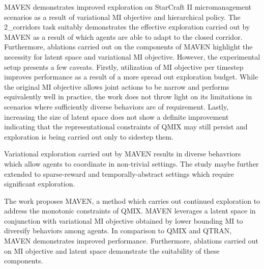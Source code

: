\documentclass[11pt,letterpaper]{article}
\begin{document}
MAVEN demonstrates improved exploration on StarCraft II micromanagement scenarios as a result of variational MI objective and hierarchical policy. The 2\_corridors task suitably demonstrates the effective exploration carried out by MAVEN as a result of which agents are able to adapt to the closed corridor. Furthermore, ablations carried out on the components of MAVEN highlight the necessity for latent space and variational MI objective. However, the experimental setup presents a few caveats. Firstly, utilization of MI objective per timestep improves performance as a result of a more spread out exploration budget. While the original MI objective allows joint actions to be narrow and performs equivalently well in practice, the work does not throw light on its limitations in scenarios where sufficiently diverse behaviors are of requirement. Lastly, increasing the size of latent space does not show a definite improvement indicating that the representational constraints of QMIX may still persist and exploration is being carried out only to sidestep them. 

Variational exploration carried out by MAVEN results in diverse behavriors which allow agents to coordinate in non-trivial settings. The study maybe further extended to sparse-reward and temporally-abstract settings which require significant exploration. 

The work proposes MAVEN, a method which carries out continued exploration to address the monotonic constraints of QMIX. MAVEN leverages a latent space in conjunction with variational MI objective obtained by lower bounding MI to diversify behaviors among agents. In comparison to QMIX and QTRAN, MAVEN demonstrates improved performance. Furthermore, ablations carried out on MI objective and latent space demonstrate the suitability of these components.
\end{document}
